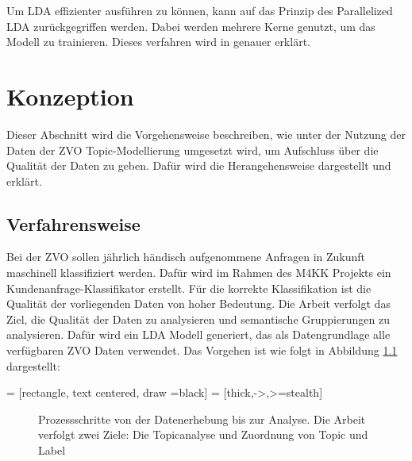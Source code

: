 \documentclass[german,version-2020-11]{uzl-thesis}
\begin{document}
Um LDA effizienter ausführen zu können, kann auf das Prinzip des Parallelized LDA zurückgegriffen werden. Dabei werden mehrere Kerne genutzt, um das Modell zu trainieren. Dieses verfahren wird in \cite{radim2} genauer erklärt.


\chapter{Konzeption} %

Dieser Abschnitt wird die Vorgehensweise beschreiben, wie unter der Nutzung der Daten der ZVO Topic-Modellierung umgesetzt wird, um Aufschluss über die Qualität der Daten zu geben. Dafür wird die Herangehensweise dargestellt und erklärt.

\section{Verfahrensweise}
Bei der ZVO sollen jährlich händisch aufgenommene Anfragen in Zukunft maschinell klassifiziert werden. Dafür wird im Rahmen des M4KK Projekts ein Kundenanfrage-Klassifikator erstellt. Für die korrekte Klassifikation ist die Qualität der vorliegenden Daten von hoher Bedeutung. Die Arbeit verfolgt das Ziel, die Qualität der Daten zu analysieren und semantische Gruppierungen zu analysieren. Dafür wird ein LDA Modell generiert, das als Datengrundlage alle verfügbaren ZVO Daten verwendet. Das Vorgehen ist wie folgt in Abbildung \ref{fig:flowchart} dargestellt:   

 = [rectangle, text centered, draw =black]
 = [thick,->,>=stealth]
\begin{figure}[H]
\begin{center}
\caption{Prozessschritte von der Datenerhebung bis zur Analyse. Die Arbeit verfolgt zwei Ziele: Die Topicanalyse und Zuordnung von Topic und Label}
\label{fig:flowchart}
\end{center}
\end{figure}
\end{document}
